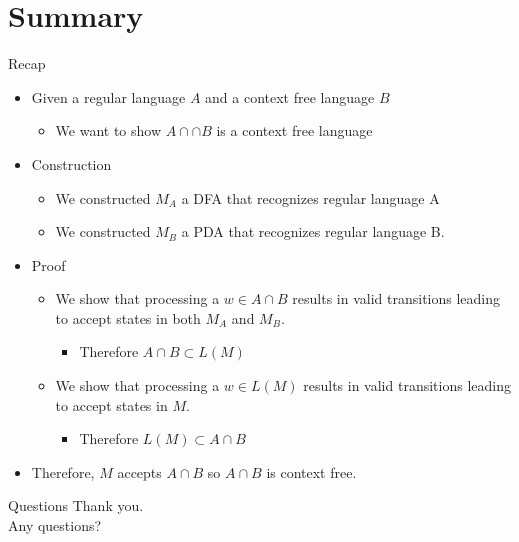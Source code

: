 \documentclass{beamer}
\begin{document}
\section{Summary}\frame{\sectionpage}
\begin{frame}{Recap}
    \begin{itemize}
        \item Given a regular language $A$ and a context free language $B$ \\
        \begin{itemize}
            \item We want to show $A\cap∩ B$ is a context free language
        \end{itemize}
        \item Construction 
            \begin{itemize}
                \item We constructed $M_A$ a DFA that recognizes regular language A
                \item We constructed $M_B$ a PDA that recognizes regular language B.
            \end{itemize}
        \item Proof
            \begin{itemize}
                \item We show that processing a $w\in A\cap B$ results in valid transitions leading to accept states in both $M_A$ and $M_B$.
                    \begin{itemize}
                        \item Therefore $A\cap B\subset L(M)$
                    \end{itemize}
                \item We show that processing a $w\in L(M)$ results in valid transitions leading to accept states in $M$.
                    \begin{itemize}
                        \item Therefore $L(M) \subset A\cap B$
                    \end{itemize}
            \end{itemize}
        \item Therefore, $M$ accepts $A\cap B$ so $A\cap B$ is context free.
    \end{itemize}
\end{frame}

\begin{frame}{Questions}
    Thank you.\\
    Any questions?
\end{frame}
\end{document}
